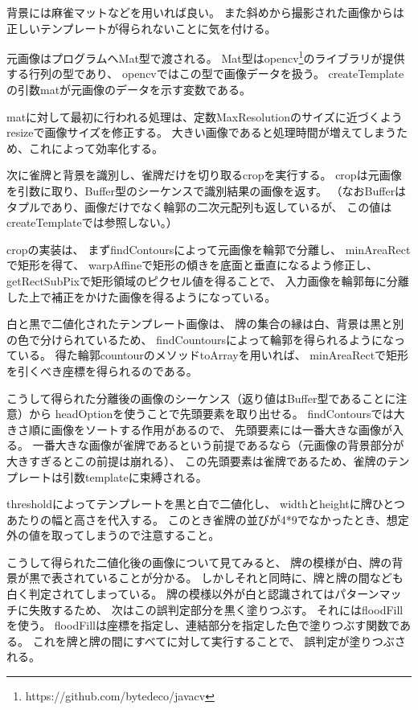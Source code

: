 \documentclass{jsarticle}
\begin{document}
\begin{multicols}{2}
背景には麻雀マットなどを用いれば良い。
また斜めから撮影された画像からは正しいテンプレートが得られないことに気を付ける。

元画像はプログラムへMat型で渡される。
Mat型はopencv\footnote{https://github.com/bytedeco/javacv}のライブラリが提供する行列の型であり、
opencvではこの型で画像データを扱う。
createTemplateの引数matが元画像のデータを示す変数である。

matに対して最初に行われる処理は、定数MaxResolutionのサイズに近づくよう
resizeで画像サイズを修正する。
大きい画像であると処理時間が増えてしまうため、これによって効率化する。

次に雀牌と背景を識別し、雀牌だけを切り取るcropを実行する。
cropは元画像を引数に取り、Buffer型のシーケンスで識別結果の画像を返す。
（なおBufferはタプルであり、画像だけでなく輪郭の二次元配列も返しているが、
この値はcreateTemplateでは参照しない。）

cropの実装は、
まずfindContoursによって元画像を輪郭で分離し、
minAreaRectで矩形を得て、
warpAffineで矩形の傾きを底面と垂直になるよう修正し、
getRectSubPixで矩形領域のピクセル値を得ることで、
入力画像を輪郭毎に分離した上で補正をかけた画像を得るようになっている。

白と黒で二値化されたテンプレート画像は、
牌の集合の縁は白、背景は黒と別の色で分けられているため、
findCountoursによって輪郭を得られるようになっている。
得た輪郭countourのメソッドtoArrayを用いれば、
minAreaRectで矩形を引くべき座標を得られるのである。

こうして得られた分離後の画像のシーケンス（返り値はBuffer型であることに注意）から
headOptionを使うことで先頭要素を取り出せる。
findContoursでは大きさ順に画像をソートする作用があるので、
先頭要素には一番大きな画像が入る。
一番大きな画像が雀牌であるという前提であるなら（元画像の背景部分が大きすぎるとこの前提は崩れる）、
この先頭要素は雀牌であるため、雀牌のテンプレートは引数templateに束縛される。

thresholdによってテンプレートを黒と白で二値化し、
widthとheightに牌ひとつあたりの幅と高さを代入する。
このとき雀牌の並びが4*9でなかったとき、想定外の値を取ってしまうので注意すること。

こうして得られた二値化後の画像について見てみると、
牌の模様が白、牌の背景が黒で表されていることが分かる。
しかしそれと同時に、牌と牌の間なども白く判定されてしまっている。
牌の模様以外が白と認識されてはパターンマッチに失敗するため、
次はこの誤判定部分を黒く塗りつぶす。
それにはfloodFillを使う。
floodFillは座標を指定し、連結部分を指定した色で塗りつぶす関数である。
これを牌と牌の間にすべてに対して実行することで、
誤判定が塗りつぶされる。


\end{multicols}
\end{document}
